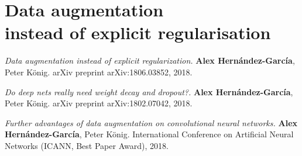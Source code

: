 {
\chapter[Data augmentation instead of explicit regularisation]{Data augmentation\\instead of explicit regularisation}
\label{ch:daugreg}
\renewcommand{\chapterpath}{includes/daug-reg}
%
\begin{outreach}
    \item \textit{Data augmentation instead of explicit regularization.} \textbf{Alex Hern{\'a}ndez-Garc{\'i}a}, Peter K{\"o}nig. arXiv preprint arXiv:1806.03852, 2018.
    \item \textit{Do deep nets really need weight decay and dropout?.} \textbf{Alex Hern{\'a}ndez-Garc{\'i}a}, Peter K{\"o}nig. arXiv preprint arXiv:1802.07042, 2018.
    \item \textit{Further advantages of data augmentation on convolutional neural networks.} \textbf{Alex Hern{\'a}ndez-Garc{\'i}a}, Peter K{\"o}nig. International Conference on Artificial Neural Networks (ICANN, Best Paper Award), 2018.
\end{outreach}
%
}
